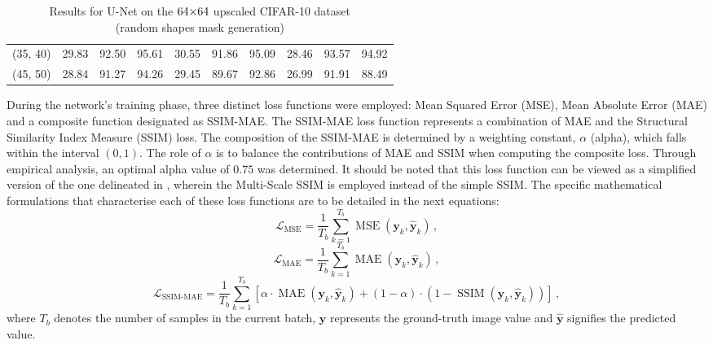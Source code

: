 \begin{table}[ht]
{\begin{tabular}{cccccccccc}
            \multicolumn{1}{c}{{(35, 40)}} & \multicolumn{1}{c}{29.83}       & \multicolumn{1}{c}{92.50}       & 95.61                          & \multicolumn{1}{c}{30.55}       & \multicolumn{1}{c}{91.86}       & 95.09        & \multicolumn{1}{c}{28.46}       & \multicolumn{1}{c}{93.57}       & 94.92        \\
            \multicolumn{1}{c}{{(45, 50)}} & \multicolumn{1}{c}{28.84}       & \multicolumn{1}{c}{91.27}       & 94.26                          & \multicolumn{1}{c}{29.45}       & \multicolumn{1}{c}{89.67}       & 92.86        & \multicolumn{1}{c}{26.99}       & \multicolumn{1}{c}{91.91}       & 88.49        \\
            \bottomrule
        \end{tabular}%
    }
    \caption[Results for U-Net on the $64\stimes 64$ upscaled CIFAR-10 dataset]{Results for U-Net on the $64\stimes 64$ upscaled CIFAR-10 dataset\\(random shapes mask generation)}
    \label{tabel:unet_cifar}
\end{table}

During the network's training phase, three distinct loss functions were employed: Mean Squared Error (MSE), Mean Absolute Error (MAE) and a composite function designated as SSIM-MAE. The SSIM-MAE loss function represents a combination of MAE and the Structural Similarity Index Measure (SSIM) loss. The composition of the SSIM-MAE is determined by a weighting constant, $\alpha$ (alpha), which falls within the interval $(0, 1)$. The role of $\alpha$ is to balance the contributions of MAE and SSIM when computing the composite loss. Through empirical analysis, an optimal alpha value of $0.75$ was determined. It should be noted that this loss function can be viewed as a simplified version of the one delineated in \cite{ssim-mae}, wherein the Multi-Scale SSIM is employed instead of the simple SSIM. The specific mathematical formulations that characterise each of these loss functions are to be detailed in the next equations:
\begin{equation}
    \mathcal{L}_{\text{MSE}} = \dfrac{1}{T_b} \sum\limits_{k=1}^{T_b} \operatorname{MSE}\left( \symbf{y}_k, \symbf{\hat{y}}_k \right)\,,
\end{equation}
\begin{equation}
    \mathcal{L}_{\text{MAE}} = \dfrac{1}{T_b} \sum\limits_{k=1}^{T_b} \operatorname{MAE}\left( \symbf{y}_k, \symbf{\hat{y}}_k \right)\,,
\end{equation}
\begin{equation}
    \mathcal{L}_{\text{SSIM-MAE}} = \dfrac{1}{T_b} \sum\limits_{k=1}^{T_b} \left[\alpha \cdot \operatorname{MAE}\left( \symbf{y}_k, \symbf{\hat{y}}_k \right) + \left(1 - \alpha \right) \cdot \left(1 - \operatorname{SSIM}\left( \symbf{y}_k, \symbf{\hat{y}}_k \right)\right) \right]\,,
\end{equation}
where $T_b$ denotes the number of samples in the current batch, $\symbf{y}$ represents the ground-truth image value and $\symbf{\hat{y}}$ signifies the predicted value.

